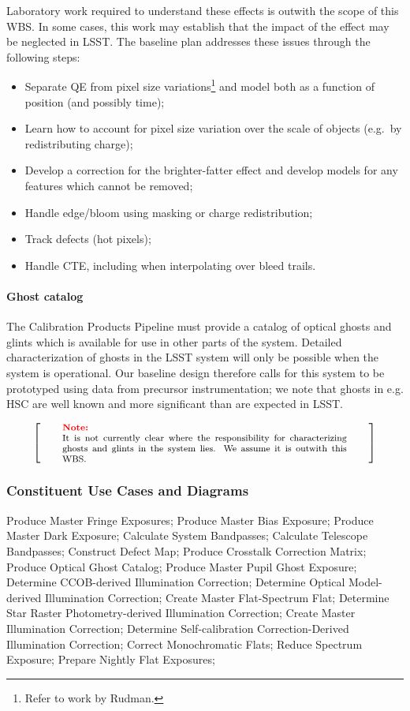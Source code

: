 \documentclass[12pt]{article}
\newenvironment{note}[1][Note]
{
  \begin{displaymath}
    \left[ \qquad
    \begin{minipage}[h]{.75\linewidth}
      \color{red} \footnotesize
      \textbf{#1:} \newline
      \color{black}
}
{
    \end{minipage}
    \normalsize
    \qquad \right]
  \end{displaymath}
}
\begin{document}
Laboratory work required to understand these effects is outwith the scope of this WBS\@. In some cases, this work may establish that the impact of the effect may be neglected in LSST\@. The baseline plan addresses these issues through the following steps:

\begin{itemize}
  \item{Separate QE from pixel size variations\footnote{Refer to work by Rudman.} and model both as a function of position (and possibly time);}
  \item{Learn how to account for pixel size variation over the scale of objects (e.g.\ by redistributing charge);}
  \item{Develop a correction for the brighter-fatter effect and develop models for any features which cannot be removed;}
  \item{Handle edge/bloom using masking or charge redistribution;}
  \item{Track defects (hot pixels);}
  \item{Handle CTE, including when interpolating over bleed trails.}
\end{itemize}

\paragraph{Ghost catalog}

The Calibration Products Pipeline must provide a catalog of optical ghosts and glints which is available for use in other parts of the system. Detailed characterization of ghosts in the LSST system will only be possible when the system is operational. Our baseline design therefore calls for this system to be prototyped using data from precursor instrumentation; we note that ghosts in e.g. HSC are well known and more significant than are expected in LSST.

\begin{note}
It is not currently clear where the responsibility for characterizing ghosts and glints in the system lies. We assume it is outwith this WBS.
\end{note}

\subsubsection{Constituent Use Cases and Diagrams}

Produce Master Fringe Exposures; Produce Master Bias Exposure; Produce Master Dark Exposure; Calculate System Bandpasses; Calculate Telescope Bandpasses; Construct Defect Map; Produce Crosstalk Correction Matrix; Produce Optical Ghost Catalog; Produce Master Pupil Ghost Exposure; Determine CCOB-derived Illumination Correction; Determine Optical Model-derived Illumination Correction; Create Master Flat-Spectrum Flat; Determine Star Raster Photometry-derived Illumination Correction; Create Master Illumination Correction; Determine Self-calibration Correction-Derived Illumination Correction; Correct Monochromatic Flats; Reduce Spectrum Exposure; Prepare Nightly Flat Exposures;
\end{document}
